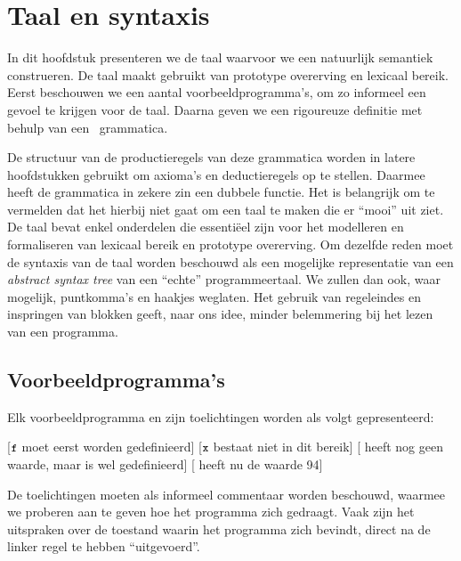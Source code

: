 \chapter{Taal en syntaxis}
\label{chp:taal}

In dit hoofdstuk presenteren we de taal waarvoor we een natuurlijk semantiek construeren. De taal maakt gebruikt van prototype overerving en lexicaal bereik. Eerst beschouwen we een aantal voorbeeldprogramma's, om zo informeel een gevoel te krijgen voor de taal. Daarna geven we een rigoureuze definitie met behulp van een \BNF\ grammatica.

De structuur van de productieregels van deze grammatica worden in latere hoofdstukken gebruikt om axioma's en deductieregels op te stellen. Daarmee heeft de grammatica in zekere zin een dubbele functie.
Het is belangrijk om te vermelden dat het hierbij niet gaat om een taal te maken die er “mooi” uit ziet. De taal bevat enkel onderdelen die essentiëel zijn voor het modelleren en formaliseren van lexicaal bereik en prototype overerving. Om dezelfde reden moet de syntaxis van de taal worden beschouwd als een mogelijke representatie van een \emph{abstract syntax tree} van een “echte” programmeertaal. We zullen dan ook, waar mogelijk, puntkomma's en haakjes weglaten. Het gebruik van regeleindes en inspringen van blokken geeft, naar ons idee, minder belemmering bij het lezen van een programma.

\section{Voorbeeldprogramma's}
\label{sec:voorbeelden}

Elk voorbeeldprogramma en zijn toelichtingen worden als volgt gepresenteerd:

\begin{NoBreak}
\codeFragmentCaption
\begin{codelines}
  [$\text{\ttfamily\small\upshape f}$ moet eerst worden gedefinieerd]
  \codeLine{}[$\text{\ttfamily\small\upshape x}$ bestaat niet in dit bereik]
  [ heeft nog geen waarde, maar is wel gedefinieerd]
  [ heeft nu de waarde 94]
\end{codelines}
\end{NoBreak}

De toelichtingen moeten als informeel commentaar worden beschouwd, waarmee we proberen aan te geven hoe het programma zich gedraagt. Vaak zijn het uitspraken over de toestand waarin het programma zich bevindt, direct na de linker regel te hebben “uitgevoerd”.


